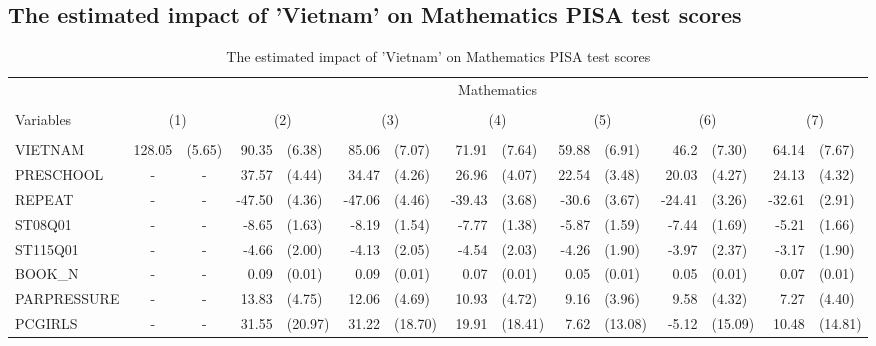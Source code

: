 \documentclass[12pt]{article}%
\begin{document}
\subsection{The estimated impact of 'Vietnam' on Mathematics PISA test scores}
	\begin{table}[H]
		\tiny
		\def\arraystretch{1}
		\def\tabcolsep{4}
		\centering
		\caption{The estimated impact of 'Vietnam' on Mathematics PISA test scores}
		\begin{tabular}{lrlrlrlrlrlrlrl}
			\toprule
			\midrule
			& \multicolumn{14}{c}{Mathematics} \\
			\cline{2-15} \\
			Variables & \multicolumn{2}{c}{(1)} & \multicolumn{2}{c}{(2)} & \multicolumn{2}{c}{(3)} & \multicolumn{2}{c}{(4)} & \multicolumn{2}{c}{(5)} & \multicolumn{2}{c}{(6)} & \multicolumn{2}{c}{(7)} \\
			\hline\\
			VIETNAM & 128.05 & (5.65) & 90.35 & (6.38) & 85.06 & (7.07) & 71.91 & (7.64) & 59.88 & (6.91) & 46.2  & (7.30) & 64.14 & (7.67) \\[0.2em]
			PRESCHOOL & \multicolumn{1}{c}{-} & \multicolumn{1}{c}{-} & 37.57 & (4.44) & 34.47 & (4.26) & 26.96 & (4.07) & 22.54 & (3.48) & 20.03 & (4.27) & 24.13 & (4.32) \\[0.2em]
			REPEAT & \multicolumn{1}{c}{-} & \multicolumn{1}{c}{-} & -47.50 & (4.36) & -47.06 & (4.46) & -39.43 & (3.68) & -30.6 & (3.67) & -24.41 & (3.26) & -32.61 & (2.91) \\[0.2em]
			ST08Q01 & \multicolumn{1}{c}{-} & \multicolumn{1}{c}{-} & -8.65 & (1.63) & -8.19 & (1.54) & -7.77 & (1.38) & -5.87 & (1.59) & -7.44 & (1.69) & -5.21 & (1.66) \\[0.2em]
			ST115Q01 & \multicolumn{1}{c}{-} & \multicolumn{1}{c}{-} & -4.66 & (2.00) & -4.13 & (2.05) & -4.54 & (2.03) & -4.26 & (1.90) & -3.97 & (2.37) & -3.17 & (1.90) \\[0.2em]
			BOOK\_N & \multicolumn{1}{c}{-} & \multicolumn{1}{c}{-} & 0.09  & (0.01) & 0.09  & (0.01) & 0.07  & (0.01) & 0.05  & (0.01) & 0.05  & (0.01) & 0.07  & (0.01) \\[0.2em]
			PARPRESSURE & \multicolumn{1}{c}{-} & \multicolumn{1}{c}{-} & 13.83 & (4.75) & 12.06 & (4.69) & 10.93 & (4.72) & 9.16  & (3.96) & 9.58  & (4.32) & 7.27  & (4.40) \\[0.2em]
			PCGIRLS & \multicolumn{1}{c}{-} & \multicolumn{1}{c}{-} & 31.55 & (20.97) & 31.22 & (18.70) & 19.91 & (18.41) & 7.62  & (13.08) & -5.12 & (15.09) & 10.48 & (14.81) \\[0.2em]

\end{tabular}
\end{table}
\end{document}
